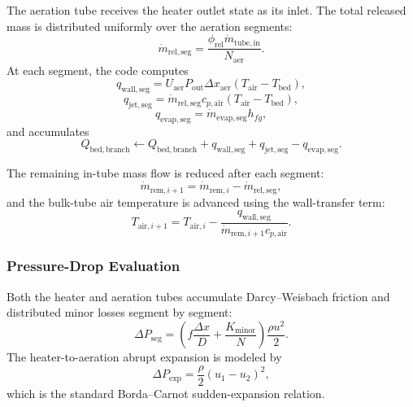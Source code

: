 \documentclass{article}
\begin{document}
The aeration tube receives the heater outlet state as its inlet. The total
released mass is distributed uniformly over the aeration segments:
\begin{equation}
\dot{m}_{\mathrm{rel,seg}}
= \frac{\phi_{\mathrm{rel}} \dot{m}_{\mathrm{tube,in}}}
{N_{\mathrm{aer}}}.
\end{equation}
At each segment, the code computes
\begin{equation}
q_{\mathrm{wall,seg}}
= U_{\mathrm{aer}} P_{\mathrm{out}} \Delta x_{\mathrm{aer}}
(T_{\mathrm{air}} - T_{\mathrm{bed}}),
\end{equation}
\begin{equation}
q_{\mathrm{jet,seg}}
= \dot{m}_{\mathrm{rel,seg}} c_{p,\mathrm{air}}
(T_{\mathrm{air}} - T_{\mathrm{bed}}),
\end{equation}
\begin{equation}
q_{\mathrm{evap,seg}}
= \dot{m}_{\mathrm{evap,seg}} h_{fg},
\end{equation}
and accumulates
\begin{equation}
Q_{\mathrm{bed,branch}}
\leftarrow
Q_{\mathrm{bed,branch}}
+ q_{\mathrm{wall,seg}} + q_{\mathrm{jet,seg}} - q_{\mathrm{evap,seg}}.
\end{equation}

The remaining in-tube mass flow is reduced after each segment:
\begin{equation}
\dot{m}_{\mathrm{rem},i+1}
= \dot{m}_{\mathrm{rem},i} - \dot{m}_{\mathrm{rel,seg}},
\end{equation}
and the bulk-tube air temperature is advanced using the wall-transfer term:
\begin{equation}
T_{\mathrm{air},i+1}
= T_{\mathrm{air},i}
- \frac{q_{\mathrm{wall,seg}}}
{\dot{m}_{\mathrm{rem},i+1} c_{p,\mathrm{air}}}.
\end{equation}

\subsubsection{Pressure-Drop Evaluation}

Both the heater and aeration tubes accumulate Darcy--Weisbach friction and
distributed minor losses segment by segment:
\begin{equation}
\Delta P_{\mathrm{seg}}
= \left(
f \frac{\Delta x}{D} + \frac{K_{\mathrm{minor}}}{N}
\right)
\frac{\rho u^2}{2}.
\end{equation}
The heater-to-aeration abrupt expansion is modeled by
\begin{equation}
\Delta P_{\mathrm{exp}}
= \frac{\rho}{2}(u_1-u_2)^2,
\end{equation}
which is the standard Borda--Carnot sudden-expansion relation.
\end{document}
